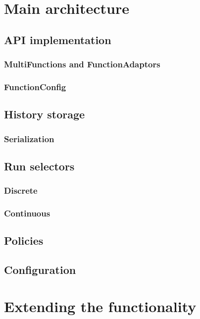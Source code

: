 \section{Main architecture}
\subsection{API implementation}
\subsubsection{MultiFunctions and FunctionAdaptors}
\subsubsection{FunctionConfig}
\subsection{History storage}
\subsubsection{Serialization}
\subsection{Run selectors}
\subsubsection{Discrete}
\subsubsection{Continuous}
\subsection{Policies}
\subsection{Configuration}
\section{Extending the functionality}
